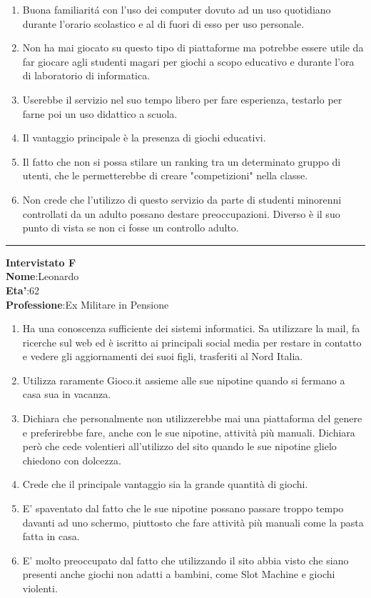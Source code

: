 \documentclass[../Report.tex]{subfiles}
\begin{document}
    \begin{enumerate}
        \item Buona familiaritá con l’uso dei computer dovuto ad un uso quotidiano durante l’orario scolastico e al di fuori di esso per uso personale.
        \item Non ha mai giocato su questo tipo di piattaforme ma potrebbe essere utile da far giocare agli studenti magari per giochi a scopo educativo e durante l’ora di laboratorio di informatica.
        \item Userebbe il servizio nel suo tempo libero per fare esperienza, testarlo per farne poi un uso didattico a scuola.
        \item Il vantaggio principale è la presenza di giochi educativi.
        \item Il fatto che non si possa stilare un ranking tra un determinato gruppo di utenti, che le permetterebbe di creare "competizioni" nella classe.
        \item Non crede che l’utilizzo di questo servizio da parte di studenti minorenni controllati da un adulto possano destare preoccupazioni. Diverso è il suo punto di vista se non ci fosse un controllo adulto. 
    \end{enumerate}
    
    \hrule
    \textbf{Intervistato F}\\
    \textbf{Nome}:Leonardo \\
    \textbf{Eta'}:62\\
    \textbf{Professione}:Ex Militare in Pensione

    \begin{enumerate}
        \item Ha una conoscenza sufficiente dei sistemi informatici. Sa utilizzare la mail, fa ricerche sul web ed è iscritto ai principali social media per restare in contatto e vedere gli aggiornamenti dei suoi figli, trasferiti al Nord Italia. 
        \item Utilizza raramente Gioco.it assieme alle sue nipotine quando si fermano a casa sua in vacanza. 
        \item Dichiara che personalmente non utilizzerebbe mai una piattaforma del genere e preferirebbe fare, anche con le sue nipotine, attività più manuali. Dichiara però che cede volentieri all'utilizzo del sito quando le sue nipotine glielo chiedono con dolcezza. 
        \item Crede che il principale vantaggio sia la grande quantità di giochi. 
        \item E' spaventato dal fatto che le sue nipotine possano passare troppo tempo davanti ad uno schermo, piuttosto che fare attività più manuali come la pasta fatta in casa. 
        \item E' molto preoccupato dal fatto che utilizzando il sito abbia visto che siano presenti anche giochi non adatti a bambini, come Slot Machine e giochi violenti.    
    \end{enumerate}
    
\end{document}
